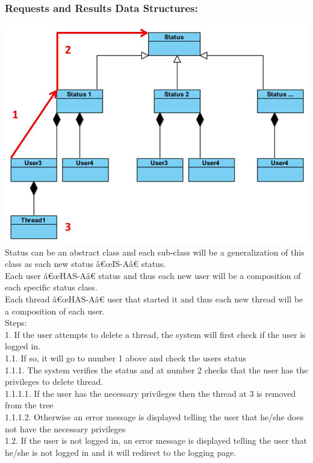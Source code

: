 \documentclass[a4paper,11pt]{article}
\begin{document}
\subsubsection*{Requests and Results Data Structures:}
\includegraphics[width=1\linewidth]{./Images/CRUDThread/Diagrams/13.jpg}\\
Status can be an abstract class and each sub-class will be a generalization of this class as each new status â€œIS-Aâ€ status.\\
Each user â€œHAS-Aâ€ status and thus each new user will be a composition of each specific status class.\\
Each thread â€œHAS-Aâ€ user that started it and thus each new thread will be a composition of each user.\\
Steps:\\
1.	If the user attempts to delete a thread, the system will first check if the user is logged in.\\
1.1.	If so, it will go to number 1 above and check the users status\\
1.1.1.	The system verifies the status and at number 2 checks that the user has the privileges to delete thread.\\
1.1.1.1.	If the user has the necessary privileges then the thread at 3 is removed from the tree\\
1.1.1.2.	Otherwise an error message is displayed telling the user that he/she does not have the necessary privileges \\
1.2.	If the user is not logged in, an error message is displayed telling the user that he/she is not logged in and it will redirect to the logging page.\\
\end{document}
